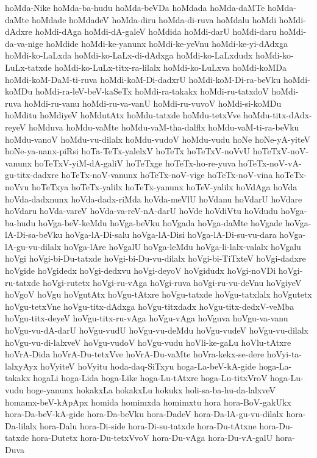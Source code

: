 {hoMda-Nike
hoMda-ba-hudu
hoMda-beVDa
hoMdada
hoMda-daMTe
hoMda-daMte
hoMdade
hoMdadeV
hoMda-diru
hoMda-di-ruva
hoMdalu
hoMdi
hoMdi-dAdxre
hoMdi-dAga
hoMdi-dA-galeV
hoMdida
hoMdi-darU
hoMdi-daru
hoMdi-da-va-nige
hoMdide
hoMdi-ke-yanunx
hoMdi-ke-yeVnu
hoMdi-ke-yi-dAdxga
hoMdi-ko-LaLxda
hoMdi-ko-LaLx-di-dAdxga
hoMdi-ko-LaLxdudx
hoMdi-ko-LuLx-tatxde
hoMdi-ko-LuLx-titx-ra-lilalx
hoMdi-ko-LuLxva
hoMdi-koMDa
hoMdi-koM-DaM-ti-ruva
hoMdi-koM-Di-dadxrU
hoMdi-koM-Di-ra-beVku
hoMdi-koMDu
hoMdi-ra-leV-beV-kaSeTx
hoMdi-ra-takakx
hoMdi-ru-tatxdoV
hoMdi-ruva
hoMdi-ru-vanu
hoMdi-ru-va-vanU
hoMdi-ru-vuvoV
hoMdi-si-koMDu
hoMditu
hoMdiyeV
hoMdutAtx
hoMdu-tatxde
hoMdu-tetxVve
hoMdu-titx-dAdx-reyeV
hoMduva
hoMdu-vaMte
hoMdu-vaM-tha-dalflx
hoMdu-vaM-ti-ra-beVku
hoMdu-vanoV
hoMdu-vu-dilalx
hoMdu-vudoV
hoMdu-vudu
hoNe
hoNe-yA-yiteV
hoNe-ya-nanx-piRsi
hoTa-TeTx-yalelxV
hoTeTx
hoTeTxV-noVvU
hoTeTxV-noV-vanunx
hoTeTxV-yiM-dA-galiV
hoTeTxge
hoTeTx-ho-re-yuva
hoTeTx-noV-vA-gu-titx-dadxre
hoTeTx-noV-vanunx
hoTeTx-noV-vige
hoTeTx-noV-vina
hoTeTx-noVvu
hoTeTxya
hoTeTx-yalilx
hoTeTx-yanunx
hoTeV-yalilx
hoVdAga
hoVda
hoVda-dadxnunx
hoVda-dadx-riMda
hoVda-meVlU
hoVdanu
hoVdarU
hoVdare
hoVdaru
hoVda-vareV
hoVda-va-reV-nA-darU
hoVde
hoVdiVtu
hoVdudu
hoVga-ba-hudu
hoVga-beV-keMdu
hoVga-beVku
hoVgada
hoVga-daMte
hoVgade
hoVga-lA-Di-sa-beVku
hoVga-lA-Di-salu
hoVga-lA-Disi
hoVga-lA-Di-su-vu-dara
hoVga-lA-gu-vu-dilalx
hoVga-lAre
hoVgalU
hoVga-leMdu
hoVga-li-lalx-valalx
hoVgalu
hoVgi
hoVgi-bi-Du-tatxde
hoVgi-bi-Du-vu-dilalx
hoVgi-bi-TiTxteV
hoVgi-dadxre
hoVgide
hoVgidedx
hoVgi-dedxvu
hoVgi-deyoV
hoVgidudx
hoVgi-noVDi
hoVgi-ru-tatxde
hoVgi-rutetx
hoVgi-ru-vAga
hoVgi-ruva
hoVgi-ru-vu-deVnu
hoVgiyeV
hoVgoV
hoVgu
hoVgutAtx
hoVgu-tAtxre
hoVgu-tatxde
hoVgu-tatxlalx
hoVgutetx
hoVgu-tetxVne
hoVgu-titx-dAdxga
hoVgu-titxdadx
hoVgu-titx-dedxV-veMba
hoVgu-titx-deyeV
hoVgu-titx-ru-vAga
hoVgu-vAga
hoVguva
hoVgu-va-vanu
hoVgu-vu-dA-darU
hoVgu-vudU
hoVgu-vu-deMdu
hoVgu-vudeV
hoVgu-vu-dilalx
hoVgu-vu-di-lalxveV
hoVgu-vudoV
hoVgu-vudu
hoVli-ke-gaLu
hoVlu-tAtxre
hoVrA-Dida
hoVrA-Du-tetxVve
hoVrA-Du-vaMte
hoVra-kekx-se-dere
hoVyi-ta-lalxyAyx
hoVyiteV
hoVyitu
hoda-daq-SiTxyu
hoga-La-beV-kA-gide
hoga-La-takakx
hogaLi
hoga-Lida
hoga-Like
hoga-Lu-tAtxre
hoga-Lu-titxVroV
hoga-Lu-vudu
hoge-yanunx
hokakxLa
hokakxLu
hokukx
holi-sa-ba-hu-da-lalxveV
homamx-beV-kApApx
homida
homimxda
homimxtu
hora
hora-BoV-gakUkx
hora-Da-beV-kA-gide
hora-Da-beVku
hora-DadeV
hora-Da-lA-gu-vu-dilalx
hora-Da-lilalx
hora-Dalu
hora-Di-side
hora-Di-su-tatxde
hora-Du-tAtxne
hora-Du-tatxde
hora-Dutetx
hora-Du-tetxVvoV
hora-Du-vAga
hora-Du-vA-galU
hora-Duva
}
